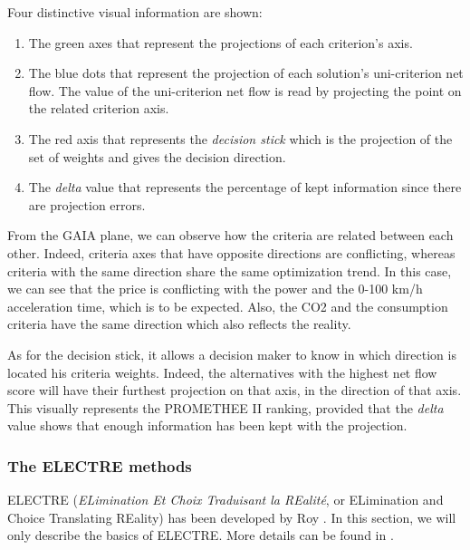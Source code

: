 \begin{enumerate}
Four distinctive visual information are shown:
\begin{enumerate}
\item The green axes that represent the projections of each criterion's axis.
\item The blue dots that represent the projection of each solution's uni-criterion net flow. The value of the uni-criterion net flow is read by projecting the point on the related criterion axis.
\item The red axis that represents the \textit{decision stick} which is the projection of the set of weights and gives the decision direction.
\item The \textit{delta} value that represents the percentage of kept information since there are projection errors.
\end{enumerate}

From the GAIA plane, we can observe how the criteria are related between each other. Indeed, criteria axes that have opposite directions are conflicting, whereas criteria with the same direction share the same optimization trend. In this case, we can see that the price is conflicting with the power and the 0-100 km/h acceleration time, which is to be expected. Also, the CO2 and the consumption criteria have the same direction which also reflects the reality.

As for the decision stick, it allows a decision maker to know in which direction is located his criteria weights. Indeed, the alternatives with the highest net flow score will have their furthest projection on that axis, in the direction of that axis. This visually represents the PROMETHEE II ranking, provided that the \textit{delta} value shows that enough information has been kept with the projection.

\end{enumerate}

\subsubsection{The ELECTRE methods}
ELECTRE (\textit{ELimination Et Choix Traduisant la REalité}, or ELimination and Choice Translating REality) has been developed by Roy \cite{Roy66}. In this section, we will only describe the basics of ELECTRE. More details can be found in \cite{electre}.

